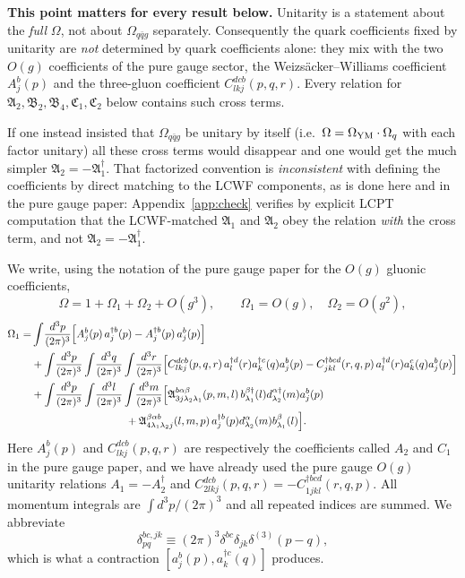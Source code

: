 \documentclass[11pt]{article}
\newcommand{\mf}{\mathfrak}
\newcommand{\dg}{\dagger}
\newcommand{\ip}[1]{\int\!\frac{d^{3}#1}{(2\pi)^{3}}}
\newcommand{\dthree}{\delta^{(3)}}
\newcommand{\OM}{\Omega}
\begin{document}
\begin{warn}
\textbf{This point matters for every result below.} Unitarity is a statement about the
\emph{full} $\OM$, not about $\OM_{q\bar qg}$ separately. Consequently the quark coefficients
fixed by unitarity are \emph{not} determined by quark coefficients alone: they mix with the two
$O(g)$ coefficients of the pure gauge sector, the Weizs\"acker--Williams coefficient $A^b_j(p)$
and the three-gluon coefficient $C^{dcb}_{lkj}(p,q,r)$. Every relation for
$\mf A_2,\mf B_2,\mf B_4,\mf C_1,\mf C_2$ below contains such cross terms.

If one instead insisted that $\OM_{q\bar qg}$ be unitary by itself (i.e.\ $\OM=\OM_{\rm YM}\cdot
\OM_{q}$ with each factor unitary) all these cross terms would disappear and one would get the much
simpler $\mf A_2=-\mf A_1^{\dg}$. That factorized convention is \emph{inconsistent} with defining
the coefficients by direct matching to the LCWF components, as is done here and in the pure gauge
paper: Appendix~\ref{app:check} verifies by explicit LCPT computation that the LCWF-matched
$\mf A_1$ and $\mf A_2$ obey the relation \emph{with} the cross term, and not $\mf A_2=-\mf
A_1^\dg$.
\end{warn}

We write, using the notation of the pure gauge paper for the $O(g)$ gluonic coefficients,
\begin{equation}
\OM=1+\OM_{1}+\OM_{2}+O(g^{3}),\qquad \OM_1=O(g),\quad \OM_2=O(g^{2}),
\end{equation}
\begin{align}
\OM_{1}=&\ip{p}\Big[A^{b}_{j}(p)\,a^{\dg b}_{j}(p)-A^{\dg b}_{j}(p)\,a^{b}_{j}(p)\Big]
\nonumber\\
&+\ip{p}\ip{q}\ip{r}\Big[C^{dcb}_{lkj}(p,q,r)\,a^{\dg d}_{l}(r)a^{\dg c}_{k}(q)a^{b}_{j}(p)
-C^{\dg bcd}_{jkl}(r,q,p)\,a^{\dg d}_{l}(r)a^{c}_{k}(q)a^{b}_{j}(p)\Big]
\nonumber\\
&+\ip{p}\ip{l}\ip{m}\Big[\mf A^{b\alpha\beta}_{3j\lambda_{2}\lambda_{1}}(p,m,l)\,
b^{\beta\dg}_{\lambda_{1}}(l)d^{\alpha\dg}_{\lambda_{2}}(m)a^{b}_{j}(p)
\nonumber\\&\hspace{3.1cm}
+\mf A^{\beta\alpha b}_{4\lambda_{1}\lambda_{2}j}(l,m,p)\,
a^{\dg b}_{j}(p)d^{\alpha}_{\lambda_{2}}(m)b^{\beta}_{\lambda_{1}}(l)\Big].
\label{eq:Om1}
\end{align}
Here $A^b_j(p)$ and $C^{dcb}_{lkj}(p,q,r)$ are respectively the coefficients called $A_2$ and
$C_1$ in the pure gauge paper, and we have already used the pure gauge $O(g)$ unitarity relations
$A_1=-A^\dg_2$ and $C^{dcb}_{2lkj}(p,q,r)=-C^{\dg bcd}_{1jkl}(r,q,p)$. All momentum integrals are
$\int d^{3}p/(2\pi)^{3}$ and all repeated indices are summed. We abbreviate
\begin{equation}
\delta_{pq}^{bc,jk}\equiv(2\pi)^{3}\delta^{bc}\delta_{jk}\dthree(p-q),
\end{equation}
which is what a contraction $[a^{b}_{j}(p),a^{\dg c}_{k}(q)]$ produces.
\end{document}

